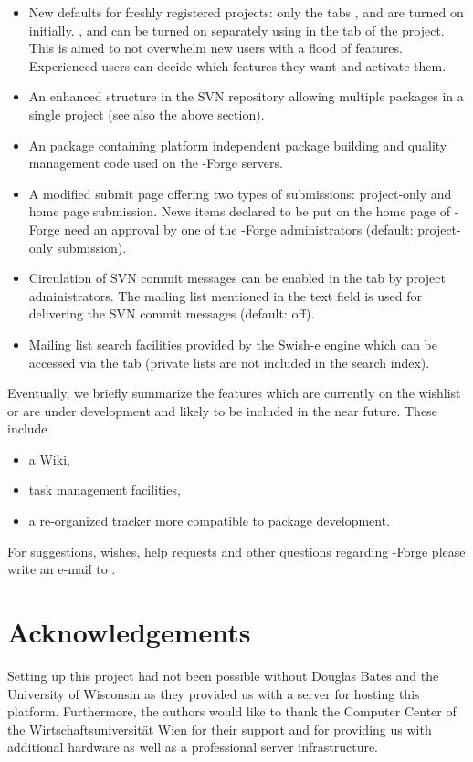 \begin{itemize}
\item New defaults for freshly registered projects: only the tabs
  ,  and  are turned on
  initially. ,  and 
  can be turned on separately using  in
  the  tab of the project. This is aimed to not overwhelm
  new users with a flood of features. Experienced users can decide
  which features they want and activate them.
\item An enhanced structure in the SVN repository allowing multiple
  packages in a single project (see also the above section).
\item An \R{} package \citep[,
  see][]{forge:theussl:2008} containing platform independent package
  building and quality management code used on the \R{}-Forge servers.
\item A modified  submit page offering two types of
  submissions: project-only and home page submission. News items
  declared to be put on the home page of \R{}-Forge need an approval
  by one of the \R{}-Forge administrators (default: project-only
  submission).
\item Circulation of SVN commit messages can be enabled in the
   tab by project administrators. The mailing list mentioned in
  the text field is used for delivering the SVN commit messages
  (default: off). 
\item Mailing list search facilities provided by the Swish-e engine
  which can be accessed via the  tab (private lists
  are not included in the search index).

\end{itemize}

Eventually, we briefly summarize the features which are currently on
the wishlist or are under development and likely to be included in the
near future. These include

\begin{itemize}
\item a Wiki,
\item task management facilities,
\item a re-organized tracker more compatible to \R{} package development. 
\end{itemize}

For suggestions, wishes, help requests and other questions regarding
\R{}-Forge please write an e-mail to .

\section{Acknowledgements}

Setting up this project had not been possible without Douglas
Bates and the University of Wisconsin as they provided us with a
server for hosting this platform. Furthermore, 
the authors would like to thank the Computer Center 
of the Wirtschaftsuniversit\"at Wien for
their support and for providing us with additional hardware as well as a
professional server infrastructure.


